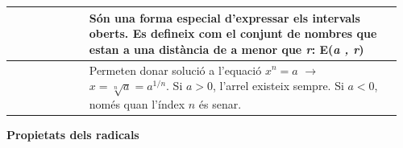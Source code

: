 \begin{center}
\begin{longtable}[h]{|>{\raggedleft\arraybackslash}p{0.19\linewidth}|p{0.77\linewidth}|}
		\\   \hline

		\cellcolor{lightgray}\noindent \textbf{Radicals}  &  
		Permeten donar solució a l'equació $x^n=a$ $\rightarrow$ $x=\sqrt[n]{a}=a^{1/n}$.
		Si $a>0$, l'arrel existeix sempre. Si $a<0$, només quan l'índex $n$ és senar.
		
		\sample{
			$x^3=8$  $\leftrightarrow$ $x=\sqrt[3]{8}=2$
		}
		\\   \hline
		
		\hline \bottomrule
	\end{longtable}
\end{center}
 
  
 
{\bfseries \large Propietats dels radicals}
\label{page:pradicals}



